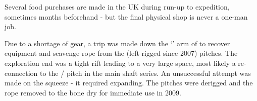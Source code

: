 \begin{marginfigure}
\checkoddpage \ifoddpage \forcerectofloat \else \forceversofloat \fi
\centering
 \caption{Several food purchases are made in the UK during run-up to expedition, sometimes months beforehand - but the final physical shop is never a one-man job. }
 \label{lidl food}
\end{marginfigure}



Due to a shortage of gear, a trip was made down the `' arm of  to recover equipment and scavenge
rope from the (left rigged since 2007) pitches. The exploration end was
a tight rift leading to a very large space, most likely a re-connection
to the  /  pitch in the main  shaft
series. An unsuccessful attempt was made on the squeeze - it required
expanding. The pitches were derigged and the rope removed to the bone
dry  for immediate use in 2009.

